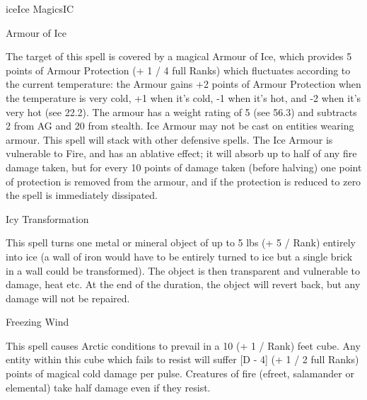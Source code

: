 \begin{College}[1.5]{ice}{Ice Magics}{IC}
\begin{spell}[S-1]{Armour of Ice}
\begin{effects}
The target of this spell is covered by a magical Armour of Ice, which
provides 5 points of Armour Protection (+ 1 / 4 full Ranks) which
fluctuates according to the current temperature: the Armour gains +2
points of Armour Protection when the temperature is very cold, +1 when
it’s cold, -1 when it’s hot, and -2 when it’s very hot (see 22.2). The
armour has a weight rating of 5 (see 56.3) and subtracts 2 from AG and
20 from stealth.  Ice Armour may not be cast on entities wearing
armour.  This spell will stack with other defensive spells.  The Ice
Armour is vulnerable to Fire, and has an ablative effect; it will
absorb up to half of any fire damage taken, but for every 10 points of
damage taken (before halving) one point of protection is removed from
the armour, and if the protection is reduced to zero the spell is
immediately dissipated.
\end{effects}
\end{spell}

\begin{spell}[S-2]{Icy Transformation}
\begin{effects}
This spell turns one metal or mineral object of up to 5 lbs (+ 5 /
Rank) entirely into ice (a wall of iron would have to be entirely
turned to ice but a single brick in a wall could be transformed).  The
object is then transparent and vulnerable to damage, heat etc.  At the
end of the duration, the object will revert back, but any damage will
not be repaired.
\end{effects}
\end{spell}

\begin{spell}[S-3]{Freezing Wind}
\begin{effects}
This spell causes Arctic conditions to prevail in a 10 (+ 1 / Rank)
feet cube.  Any entity within this cube which fails to resist will
suffer [D - 4] (+ 1 / 2 full Ranks) points of magical cold damage per
pulse.  Creatures of fire (efreet, salamander or elemental) take half
damage even if they resist.
\end{effects}
\end{spell}


\end{College}
